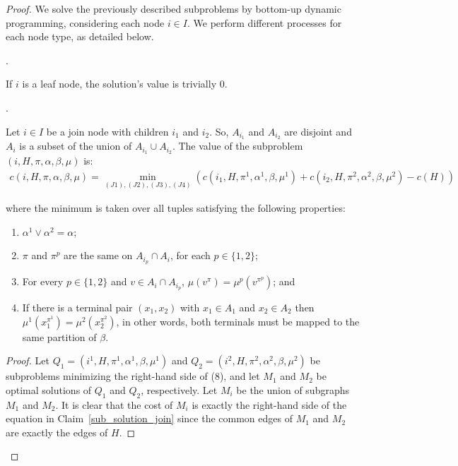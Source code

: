 \begin{proof}


We solve the previously described subproblems by bottom-up dynamic programming, considering each node $i \in I$. We perform different processes for each node type, as detailed below.


.

If \(i\) is a leaf node, the solution's value is trivially 0.

.


\begin{claim} \label{sub_solution_join}
    Let $i \in I$ be a join node with children $i_1$ and $i_2$.
    So, \(A_{i_1}\) and \(A_{i_2}\) are disjoint and \(A_i\) is a subset of the union of \(A_{i_1} \cup A_{i_2}\).
    The value of the subproblem $(i, H, \pi, \alpha, \beta, \mu)$ is:
\begin{align*}
  c(i, H, \pi, \alpha, \beta, \mu) = \min_{(J1), (J2), (J3), (J4)} \left(c(i_1, H, \pi^1, \alpha^1, \beta, \mu^1) + c(i_2, H, \pi^2, \alpha^2, \beta, \mu^2) - c(H)\right)
\end{align*}

where the minimum is taken over all tuples satisfying the following properties:

\begin{enumerate}[(J1)]
    \item \(\alpha^1 \vee \alpha^2 = \alpha\);
    \item \(\pi\) and \(\pi^p\) are the same on \(A_{i_p} \cap A_i\), for each \(p  \in \{1, 2\}\);
    \item For every \(p  \in \{1, 2\}\) and \(v \in A_i \cap A_{i_p}\), \(\mu(v^\pi) = \mu^p(v^{\pi^p})\); and
    \item If there is a terminal pair \((x_1, x_2)\) with \(x_1 \in A_1\) and \(x_2 \in A_2\) then \(\mu^1(x_1^{\pi^1}) = \mu^2(x_2^{\pi^2})\), in other words, both terminals must be mapped to the same partition of \(\beta\).
\end{enumerate}

\end{claim}

\begin{proof}
Let \(Q_1 = (i^1, H, \pi^1, \alpha^1, \beta, \mu^1)\) and \(Q_2 = (i^2, H, \pi^2, \alpha^2, \beta, \mu^2)\) be subproblems minimizing the right-hand side of (8), and let \(M_1\) and \(M_2\) be optimal solutions of \(Q_1\) and \(Q_2\), respectively. Let \(M_i\) be the union of subgraphs \(M_1\) and \(M_2\). It is clear that the cost of \(M_i\) is exactly the right-hand side of the equation in Claim~\ref{sub_solution_join} since the common edges of \(M_1\) and \(M_2\) are exactly the edges of \(H\).


\end{proof}
\end{proof}
